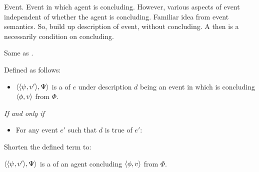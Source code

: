 \begin{note}
  Event.
  Event in which agent is concluding.
  However, various aspects of event independent of whether the agent is concluding.
  Familiar idea from event semantics.
  So, build up description of event, without concluding.
  A \requ{} then is a necessarily condition on concluding.

  Same as \qWhyV{}.


  Defined as follows:

  \begin{definition}[A \requ{0}]
    \label{def:requ}


    \begin{itemize}
    \item
      \(\langle \langle \psi, v' \rangle, \Psi \rangle\) is a \emph{\requ{}} of \(e\) under description \(d\) being an event in which \vAgent{} is concluding \(\langle \phi, v \rangle\) from \(\Phi\).
    \end{itemize}

    \emph{If and only if}

    \begin{itemize}
    \item
      For any event \(e'\) such that \(d\) is true of \(e'\):
    \end{itemize}
    \vspace{-\baselineskip}
  \end{definition}

  \noindent%
  Shorten the defined term to:
  \begin{notation}
  \item
    \(\langle \langle \psi, v' \rangle, \Psi \rangle\) is a \requ{} of an agent concluding \(\langle \phi, v \rangle\) from \(\Phi\).
  \end{notation}
\end{note}

